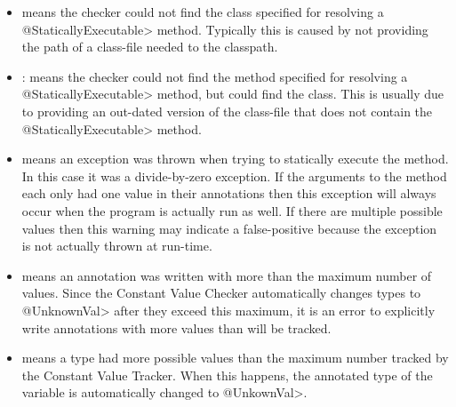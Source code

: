 \begin{itemize}
\item {}  means the checker could not find the class
  specified for resolving a \<@StaticallyExecutable> method. Typically
  this is caused by not providing the path of a class-file needed to
  the classpath.
\item {}: means the checker could not
  find the method  specified for resolving a \<@StaticallyExecutable>
  method, but could find the class. This is usually due to providing
  an out-dated version of the class-file that does not contain the
  \<@StaticallyExecutable> method.
\item {} means an exception was thrown
  when trying to statically execute the method. In this case it was a
  divide-by-zero exception. If the arguments to the method each only
  had one value in their annotations then this exception will always
  occur when the program is actually run as well. If there are
  multiple possible values then this warning may indicate a
  false-positive because the exception is not actually thrown at
  run-time.
\item {} means an annotation was written with more than
  the maximum number of values. Since the Constant Value Checker
  automatically changes types to \<@UnknownVal> after they exceed this
  maximum, it is an error to explicitly write annotations with more
  values than will be tracked.
\item {} means a type had
  more possible values than the maximum number tracked by the Constant
  Value Tracker. When this happens, the annotated type of the variable
  is automatically changed to \<@UnkownVal>.

 

\end{itemize}


